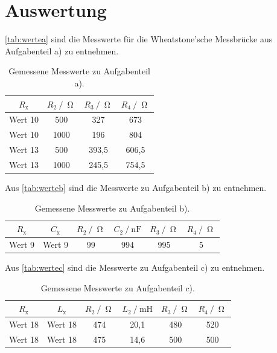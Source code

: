 \section{Auswertung}
\label{sec:Auswertung}

\autoref{tab:wertea} sind die Messwerte für die Wheatstone'sche Messbrücke aus Aufgabenteil a) zu entnehmen.

\begin{table}[H]
  \centering
  \caption{Gemessene Messwerte zu Aufgabenteil a).}
  \label{tab:wertea}
  \begin{tabular}{c c c c}
    \toprule
    $R_{\text{x}}$ & $R_{\text{2}} \:/\: \upOmega$ & $R_{\text{3}} \:/\: \upOmega$ & $R_{\text{4}} \:/\: \upOmega$ \\
    \midrule
    Wert 10 & 500 & 327 & 673 \\
    Wert 10 & 1000 & 196 & 804 \\
    Wert 13 & 500 & 393,5 & 606,5 \\
    Wert 13 & 1000 & 245,5 & 754,5 \\
    \bottomrule
  \end{tabular}
\end{table}

Aus \autoref{tab:werteb} sind die Messwerte zu Aufgabenteil b) zu entnehmen.

\begin{table}[H]
  \centering
  \caption{Gemessene Messwerte zu Aufgabenteil b).}
  \label{tab:werteb}
  \begin{tabular}{c c c c c c}
    \toprule
    $R_{\text{x}}$ & $C_{\text{x}}$ & $R_{\text{2}} \:/\: \upOmega$ & $C_{\text{2}} \:/\: \si{\nano\farad}$ & $R_{\text{3}} \:/\: \upOmega$ & $R_{\text{4}} \:/\: \upOmega$ \\
    \midrule
    Wert 9 & Wert 9 & 99 & 994 & 995 & 5 \\
    \bottomrule
  \end{tabular}
\end{table}

Aus \autoref{tab:wertec} sind die Messwerte zu Aufgabenteil c) zu entnehmen.

\begin{table}[H]
  \centering
  \caption{Gemessene Messwerte zu Aufgabenteil c).}
  \label{tab:wertec}
  \begin{tabular}{c c c c c c}
    \toprule
    $R_{\text{x}}$ & $L_{\text{x}}$ & $R_{\text{2}} \:/\: \upOmega$ & $L_{\text{2}} \:/\: \si{\milli\henry}$ & $R_{\text{3}} \:/\: \upOmega$ & $R_{\text{4}} \:/\: \upOmega$ \\
    \midrule
    Wert 18 & Wert 18 & 474 & 20,1 & 480 & 520 \\
    Wert 18 & Wert 18 & 475 & 14,6 & 500 & 500 \\
    \bottomrule
  \end{tabular}
\end{table}

